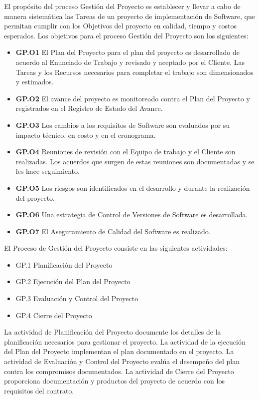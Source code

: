 \documentclass[a4paper,12pt]{article}
\begin{document}
\begin{enumerate}
 El propósito del proceso Gestión del Proyecto es establecer y llevar a cabo de manera sistemática las Tareas de un proyecto de implementación de Software, que permitan cumplir
 con los Objetivos del proyecto en calidad, tiempo y costos esperados. Los objetivos para el proceso Gestión del Proyecto son los siguientes:
 \begin{itemize}
  \item \textbf{GP.O1} El Plan del Proyecto para el plan del proyecto es desarrollado de acuerdo al Enunciado de Trabajo y revisado y aceptado por el Cliente. Las Tareas y los Recursos
  necesarios para completar el trabajo son dimensionados y estimados.
  \item \textbf{GP.O2} El avance del proyecto es monitoreado contra el Plan del Proyecto y registrados en el Registro de Estado del Avance.
  \item \textbf{GP.O3} Los cambios a los requisitos de Software son evaluados por su impacto técnico, en costo y en el cronograma.
  \item \textbf{GP.O4} Reuniones de revisión con el Equipo de trabajo y el Cliente son realizadas. Los acuerdos que surgen de estas reuniones son documentadas y se les hace seguimiento.
  \item \textbf{GP.O5} Los riesgos son identificados en el desarrollo y durante la realización del proyecto.
  \item \textbf{GP.O6} Una estrategia de Control de Versiones de Software es desarrollada.
  \item \textbf{GP.O7} El Aseguramiento de Calidad del Software es realizado.
 \end{itemize}
 El Proceso de Gestión del Proyecto consiste en las siguientes actividades:
 \begin{itemize}
  \item GP.1 Planificación del Proyecto
  \item GP.2 Ejecución del Plan del Proyecto
  \item GP.3 Evaluación y Control del Proyecto
  \item GP.4 Cierre del Proyecto
 \end{itemize}
 La actividad de Planificación del Proyecto documente los detalles de la planificación necesarios para gestionar el proyecto.
 La actividad de la ejecución del Plan del Proyecto implementan el plan documentado en el proyecto.
 La actividad de Evaluación y Control del Proyecto evalúa el desempeño del plan contra los compromisos documentados.
 La actividad de Cierre del Proyecto proporciona documentación y productos del proyecto de acuerdo con los requisitos del contrato.


 
  
\end{enumerate}
\end{document}
